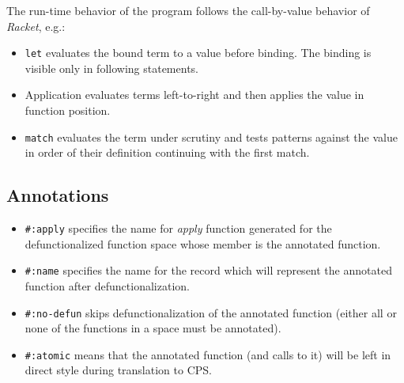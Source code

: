 The run-time behavior of the program follows the call-by-value behavior of \emph{Racket}, e.g.:
\begin{itemize}
  \item \lstinline!let! evaluates the bound term to a value before binding.
  The binding is visible only in following statements.
  \item Application evaluates terms left-to-right and then applies the value in function position.
  \item \lstinline!match! evaluates the term under scrutiny and tests patterns against the value in order of their definition continuing with the first match.
\end{itemize}

\subsection*{Annotations}
\begin{itemize}
  \item \lstinline!#:apply! specifies the name for \emph{apply} function generated for the defunctionalized function space whose member is the annotated function.
  \item \lstinline!#:name! specifies the name for the record which will represent the annotated function after defunctionalization.
  \item \lstinline!#:no-defun! skips defunctionalization of the annotated function (either all or none of the functions in a space must be annotated).
  \item \lstinline!#:atomic! means that the annotated function (and calls to it) will be left in direct style during translation to CPS.
\end{itemize}




